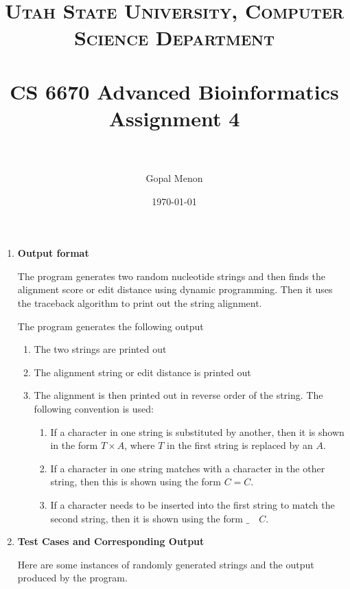 \documentclass[paper=a4, fontsize=11pt]{scrartcl} %
\title{	
\normalfont \normalsize 
\textsc{Utah State University, Computer Science Department} \\ [25pt] %
\horrule{0.5pt} \\[0.4cm] %
\huge CS 6670 Advanced Bioinformatics\\Assignment 4 \\ %
\horrule{2pt} \\[0.5cm] %
}
\author{Gopal Menon} %
\date{\normalsize\today} %
\numberwithin{equation}{section} %
\numberwithin{figure}{section} %
\numberwithin{table}{section} %
\begin{document}
\maketitle %

\begin{enumerate}

\item \textbf{Output format}

The program generates two random nucleotide strings and then finds the alignment score or edit distance using dynamic programming. Then it uses the traceback algorithm to print out the string alignment.

The program generates the following output

\begin{enumerate}

\item The two strings are printed out

\item The alignment string or edit distance is printed out

\item The alignment is then printed out in reverse order of the string. The following convention is used:

\begin{enumerate}

\item If a character in one string is substituted by another, then it is shown in the form $T \times A$, where $T$ in the first string is replaced by an $A$.
 
 \item If a character in one string matches with a character in the other string, then this is shown using the form $C = C$.
 
 \item If a character needs to be inserted into the first string to match the second string, then it is shown using the form $\_ \quad C$.
 
\end{enumerate}
 
\end{enumerate}

\item \textbf{Test Cases and Corresponding Output}

Here are some instances of randomly generated strings and the output produced by the program.
\clearpage

\begin{verbatim}


\end{verbatim}
\end{enumerate}
\end{document}
